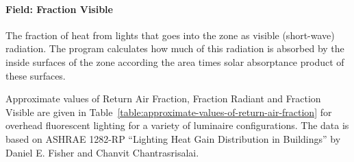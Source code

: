 \paragraph{Field: Fraction Visible}\label{field-fraction-visible}

The fraction of heat from lights that goes into the zone as visible (short-wave) radiation. The program calculates how much of this radiation is absorbed by the inside surfaces of the zone according the area times solar absorptance product of these surfaces.

Approximate values of Return Air Fraction, Fraction Radiant and Fraction Visible are given in Table~\ref{table:approximate-values-of-return-air-fraction} for overhead fluorescent lighting for a variety of luminaire configurations. The data is based on ASHRAE 1282-RP ``Lighting Heat Gain Distribution in Buildings'' by Daniel E. Fisher and Chanvit Chantrasrisalai.

